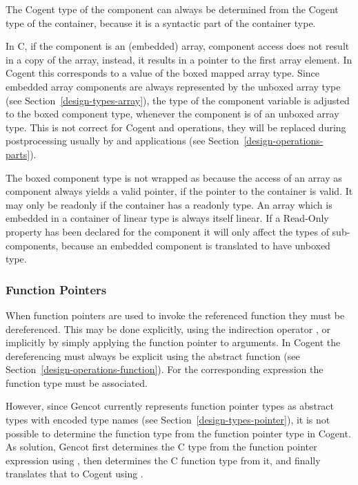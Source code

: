 The Cogent type of the component can always be determined from the Cogent type of the container, because it is a syntactic
part of the container type.

In C, if the component is an (embedded) array, component access does not result in a copy of the array, instead, it results
in a pointer to the first array element. In Cogent this corresponds to a value of the boxed mapped array type. Since
embedded array components are always represented by the unboxed array type (see Section~\ref{design-types-array}), the
type of the component variable is adjusted to the boxed component type, whenever the component is of an unboxed array type.
This is not correct for Cogent  and  operations, they will be replaced during postprocessing usually
by  and  applications (see Section~\ref{design-operations-parts}).

The boxed component type is not wrapped as  because the access of an array as component always yields a valid
pointer, if the pointer to the container is valid. It may only be readonly if the container has a readonly type. An array
which is embedded in a container of linear type is always itself linear. If a Read-Only property has been declared for the
component it will only affect the types of sub-components, because an embedded component is translated to have unboxed type.

\subsubsection{Function Pointers}

When function pointers are used to invoke the referenced function they must be dereferenced. This may be done explicitly,
using the indirection operator \code{*}, or implicitly by simply applying the function pointer to arguments. In Cogent
the dereferencing must always be explicit using the abstract function  (see
Section~\ref{design-operations-function}). For the corresponding expression the function type must be associated.

However, since Gencot currently represents function pointer types as abstract types with encoded type names (see
Section~\ref{design-types-pointer}), it is not possible to determine the function type from the function pointer
type in Cogent. As solution, Gencot first determines the C type from the function pointer expression using ,
then determines the C function type from it, and finally translates that to Cogent using .

